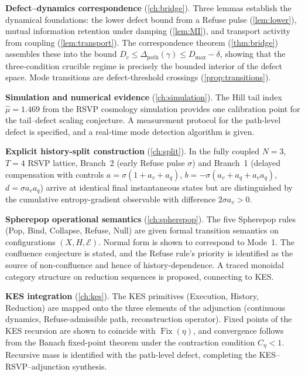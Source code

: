\documentclass[12pt, oneside]{memoir}
\DeclareMathOperator{\Fix}{Fix}
\newcommand{\Dpth}{\Delta_{\mathrm{path}}}
\newcommand{\aq}{a_q}
\newcommand{\av}{a_v}
\begin{document}
\medskip\noindent
\textbf{Defect--dynamics correspondence}
(\cref{ch:bridge}).  Three lemmas establish the dynamical foundations: the lower defect
bound from a Refuse pulse (\cref{lem:lower}), mutual information retention under damping
(\cref{lem:MI}), and transport activity from coupling (\cref{lem:transport}).  The
correspondence theorem (\cref{thm:bridge}) assembles these into the bound $D_c \le
\Dpth(\gamma) \le D_{\max} - \delta$, showing that the three-condition crucible regime
is precisely the bounded interior of the defect space.  Mode transitions are
defect-threshold crossings (\cref{prop:transitions}).

\medskip\noindent
\textbf{Simulation and numerical evidence}
(\cref{ch:simulation}).  The Hill tail index $\hat\mu = 1.469$ from the RSVP cosmology
simulation provides one calibration point for the tail--defect scaling conjecture.  A
measurement protocol for the path-level defect is specified, and a real-time mode
detection algorithm is given.

\medskip\noindent
\textbf{Explicit history-split construction}
(\cref{ch:split}).  In the fully coupled $N=3$, $T=4$ RSVP lattice, Branch~2 (early
Refuse pulse $\sigma$) and Branch~1 (delayed compensation with controls $a =
\sigma(1+\av+\aq)$, $b = -\sigma(\av+\aq+\av\aq)$, $d = \sigma\av\aq$) arrive at
identical final instantaneous states but are distinguished by the cumulative
entropy-gradient observable with difference $2\sigma\av > 0$.

\medskip\noindent
\textbf{Spherepop operational semantics}
(\cref{ch:spherepop}).  The five Spherepop rules (Pop, Bind, Collapse, Refuse, Null)
are given formal transition semantics on configurations $(X, H, \mathcal{E})$.  Normal
form is shown to correspond to Mode~1.  The confluence conjecture is stated, and the
Refuse rule's priority is identified as the source of non-confluence and hence of
history-dependence.  A traced monoidal category structure on reduction sequences is
proposed, connecting to KES.

\medskip\noindent
\textbf{KES integration}
(\cref{ch:kes}).  The KES primitives (Execution, History, Reduction) are mapped onto
the three elements of the adjunction (continuous dynamics, Refuse-admissible path,
reconstruction operator).  Fixed points of the KES recursion are shown to coincide with
$\Fix(\eta)$, and convergence follows from the Banach fixed-point theorem under the
contraction condition $C_\eta < 1$.  Recursive mass is identified with the path-level
defect, completing the KES--RSVP--adjunction synthesis.
\end{document}
